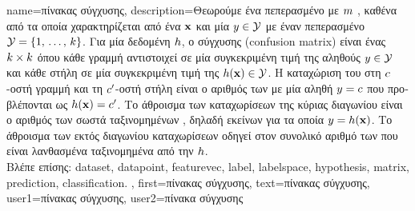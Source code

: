 {name={\foreignlanguage{greek}{πίνακας σύγχυσης}}, 
	description={\foreignlanguage{greek}{Θεωρούμε ένα πεπερασμένο} 
		 \foreignlanguage{greek}{με} $m$ ,  
		\foreignlanguage{greek}{καθένα από τα οποία χαρακτηρίζεται από ένα}  ${\bf x}$ 
		\foreignlanguage{greek}{και μία}  $y \in \mathcal{Y}$ \foreignlanguage{greek}{με έναν πεπερασμένο}
		 $\mathcal{Y} = \{1, \,\ldots, \,k\}$. \foreignlanguage{greek}{Για μία δεδομένη} 
		 $h$, \foreignlanguage{greek}{ο}  \foreignlanguage{greek}{σύγχυσης} 
		(confusion matrix) \foreignlanguage{greek}{είναι ένας $k \times k$}  
		\foreignlanguage{greek}{όπου κάθε γραμμή αντιστοιχεί σε μία συγκεκριμένη τιμή της αληθούς}  
		$y \in \mathcal{Y}$ \foreignlanguage{greek}{και κάθε στήλη σε μία συγκεκριμένη τιμή της}  
		$h({\bf x}) \in \mathcal{Y}$. \foreignlanguage{greek}{Η καταχώριση του}  
		\foreignlanguage{greek}{στη $c$-οστή γραμμή και τη $c'$-οστή στήλη είναι ο αριθμός των}  
		\foreignlanguage{greek}{με μία αληθή}  $y = c$ \foreignlanguage{greek}{που προβλέπονται 
		ως $h({\bf x}) = c'$. Το άθροισμα των καταχωρίσεων της κύριας διαγωνίου είναι ο αριθμός των σωστά
		ταξινομημένων} , \foreignlanguage{greek}{δηλαδή εκείνων για τα οποία 
		$y = h({\bf x})$. Το άθροισμα των εκτός διαγωνίου καταχωρίσεων οδηγεί στον συνολικό αριθμό των}
		 \foreignlanguage{greek}{που είναι λανθασμένα ταξινομημένα από την} $h$.
		\\
		\foreignlanguage{greek}{Βλέπε επίσης:} \gls{dataset}, \gls{datapoint}, \gls{featurevec}, \gls{label}, \gls{labelspace}, \gls{hypothesis}, 
		\gls{matrix}, \gls{prediction}, \gls{classification}. },
	first={\foreignlanguage{greek}{πίνακας σύγχυσης}},
	text={\foreignlanguage{greek}{πίνακας σύγχυσης}},
	user1={\foreignlanguage{greek}{πίνακας σύγχυσης}}, %
	user2={\foreignlanguage{greek}{πίνακα σύγχυσης}} %
}


